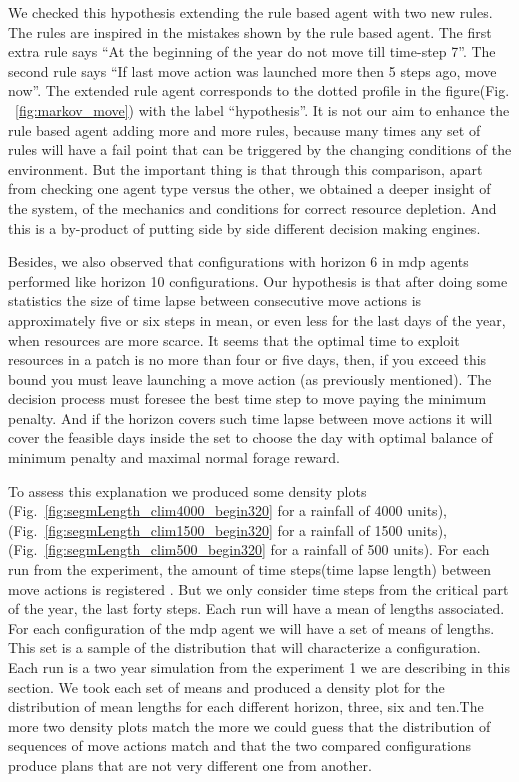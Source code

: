 \documentclass[11pt,oneside,a4paper,openright]{report}
\begin{document}
We checked this hypothesis extending the rule based agent with two new rules. The rules are inspired in the 
mistakes shown by the rule based agent. The first extra rule says “At the beginning of the year do not move 
till time-step 7”. The second rule says “If last move action was launched more then 5 steps ago, move now”. 
The extended rule agent corresponds to the dotted profile in the figure(Fig. ~\ref{fig:markov_move}) with the label “hypothesis”. 
It is not our aim to enhance the rule based agent adding more and more rules, because many times any set of 
rules will have a fail point that can be triggered by the changing conditions of the environment. But the 
important thing is that through this comparison, apart from checking one agent type versus the other, we 
obtained a deeper insight of the system, of the mechanics and conditions for correct resource depletion. 
And this is a by-product of putting side by side different decision making engines. 

Besides, we also observed that configurations with horizon 6 in mdp agents performed like horizon 10 
configurations. Our hypothesis is that after doing some statistics the size of time lapse between consecutive
move actions is approximately five or six steps in mean, or even less for the last days of the year, when resources are more scarce. It seems that the optimal time to exploit resources in a patch is no more than four
or five days, then, if you exceed this bound you must leave launching a move action (as previously mentioned). 
The decision process must foresee the best time step to move paying the minimum penalty. And if the horizon 
covers such time lapse between move actions  it will cover the feasible days inside the set to choose the day
with optimal balance of minimum penalty and maximal normal forage reward.  

To assess this explanation we produced some density plots  (Fig.~\ref{fig:segmLength_clim4000_begin320} for a 
rainfall of 4000 units), (Fig.~\ref{fig:segmLength_clim1500_begin320} for a rainfall of 1500 units),
(Fig.~\ref{fig:segmLength_clim500_begin320} for a rainfall of 500 units). For each run from the experiment, 
the amount of time steps(time lapse length) between move actions is registered . But we only consider time 
steps from the critical part of the year, the last forty steps.
Each run will have a mean of lengths associated. For each configuration of the mdp agent we will have a set 
of means of lengths. This set is a sample of the distribution that will characterize a configuration. 
Each run is a two year simulation from the experiment 1 we are describing in this section. We took each set 
of means and produced a density plot for the distribution of mean lengths for each different horizon, three, 
six and ten.The more two density plots match the more we could guess that the distribution of sequences of move actions match and that the two compared configurations produce plans that are not very different one from another.
\end{document}
